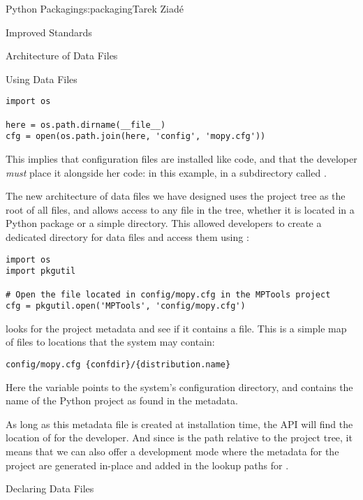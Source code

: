 \begin{aosachapter}{Python Packaging}{s:packaging}{Tarek Ziad\'{e}}
\begin{aosasect1}{Improved Standards}
\begin{aosasect2}{Architecture of Data Files}
\begin{aosasect3}{Using Data Files}
\begin{verbatim}
import os

here = os.path.dirname(__file__)
cfg = open(os.path.join(here, 'config', 'mopy.cfg'))
\end{verbatim}

\noindent This implies that configuration files are installed like code, and
that the developer \emph{must} place it alongside her code: in this
example, in a subdirectory called .

The new architecture of data files we have designed
uses the project tree as the root
of all files, and allows access to any file in the tree, whether it is
located in a Python package or a simple directory.  This allowed
developers to create a dedicated directory for data files and access
them using :

\begin{verbatim}
import os
import pkgutil

# Open the file located in config/mopy.cfg in the MPTools project
cfg = pkgutil.open('MPTools', 'config/mopy.cfg')
\end{verbatim}

\noindent {} looks for the project metadata and see if it
contains a  file. This is a simple map of files to
locations that the system may contain:

\begin{verbatim}
config/mopy.cfg {confdir}/{distribution.name}
\end{verbatim}

\noindent Here the  variable points to the
system's configuration directory, and 
contains the name of the Python project as found in the metadata.


As long as this  metadata file is created at
installation time, the API will find the location of 
for the developer.  And since  is the path
relative to the project tree, it means that we can also offer a
development mode where the metadata for the project are generated
in-place and added in the lookup paths for .

\end{aosasect3}

\begin{aosasect3}{Declaring Data Files}


\end{aosasect3}
\end{aosasect2}
\end{aosasect1}
\end{aosachapter}
